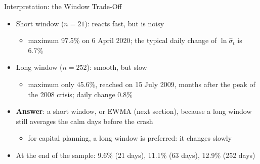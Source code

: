 \begin{frame}{Interpretation: the Window Trade-Off}
\itemsize{\small}
\begin{itemize}
    \item Short window ($n = 21$): reacts fast, but is noisy
    \begin{itemize}
        \item maximum 97.5\% on 6 April 2020; the typical daily change of $\ln\hat\sigma_t$ is 6.7\%
    \end{itemize}
    \item Long window ($n = 252$): smooth, but slow
    \begin{itemize}
        \item maximum only 45.6\%, reached on 15 July 2009, months after the peak of the 2008 crisis; daily change 0.8\%
    \end{itemize}
    \item \textbf{Answer}: a short window, or EWMA (next section), because a long window still averages the calm days before the crash
    \begin{itemize}
        \item for capital planning, a long window is preferred: it changes slowly
    \end{itemize}
    \item At the end of the sample: 9.6\% (21 days), 11.1\% (63 days), 12.9\% (252 days)
\end{itemize}
\end{frame}

